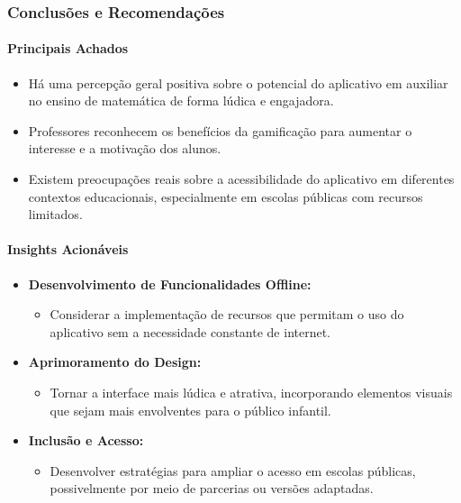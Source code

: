 \subsubsection{Conclusões e Recomendações}

\paragraph{Principais Achados}

\begin{itemize}
    \item Há uma percepção geral positiva sobre o potencial do aplicativo em auxiliar no ensino de matemática de forma lúdica e engajadora.
    \item Professores reconhecem os benefícios da gamificação para aumentar o interesse e a motivação dos alunos.
    \item Existem preocupações reais sobre a acessibilidade do aplicativo em diferentes contextos educacionais, especialmente em escolas públicas com recursos limitados.
\end{itemize}

\paragraph{Insights Acionáveis}

\begin{itemize}
    \item \textbf{Desenvolvimento de Funcionalidades Offline:}
    \begin{itemize}
        \item Considerar a implementação de recursos que permitam o uso do aplicativo sem a necessidade constante de internet.
    \end{itemize}
    \item \textbf{Aprimoramento do Design:}
    \begin{itemize}
        \item Tornar a interface mais lúdica e atrativa, incorporando elementos visuais que sejam mais envolventes para o público infantil.
    \end{itemize}
    \item \textbf{Inclusão e Acesso:}
    \begin{itemize}
        \item Desenvolver estratégias para ampliar o acesso em escolas públicas, possivelmente por meio de parcerias ou versões adaptadas.
    \end{itemize}
\end{itemize}

